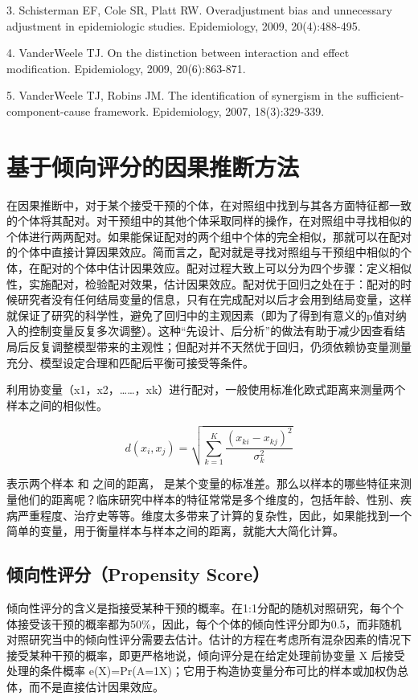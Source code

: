 \documentclass[
  chinese-hans,
  letterpaper,
  DIV=11,
  numbers=noendperiod]{scrreprt}
\begin{document}
3. Schisterman EF, Cole SR, Platt RW. Overadjustment bias and
unnecessary adjustment in epidemiologic studies. Epidemiology, 2009,
20(4):488-495.

4. VanderWeele TJ. On the distinction between interaction and effect
modification. Epidemiology, 2009, 20(6):863-871.

5. VanderWeele TJ, Robins JM. The identification of synergism in the
sufficient-component-cause framework. Epidemiology, 2007, 18(3):329-339.


\chapter{基于倾向评分的因果推断方法}\label{ux57faux4e8eux503eux5411ux8bc4ux5206ux7684ux56e0ux679cux63a8ux65adux65b9ux6cd5}

在因果推断中，对于某个接受干预的个体，在对照组中找到与其各方面特征都一致的个体将其配对。对干预组中的其他个体采取同样的操作，在对照组中寻找相似的个体进行两两配对。如果能保证配对的两个组中个体的完全相似，那就可以在配对的个体中直接计算因果效应。简而言之，配对就是寻找对照组与干预组中相似的个体，在配对的个体中估计因果效应。配对过程大致上可以分为四个步骤：定义相似性，实施配对，检验配对效果，估计因果效应。配对优于回归之处在于：配对的时候研究者没有任何结局变量的信息，只有在完成配对以后才会用到结局变量，这样就保证了研究的科学性，避免了回归中的主观因素（即为了得到有意义的p值对纳入的控制变量反复多次调整）。这种``先设计、后分析''的做法有助于减少因查看结局后反复调整模型带来的主观性；但配对并不天然优于回归，仍须依赖协变量测量充分、模型设定合理和匹配后平衡可接受等条件。

利用协变量（x1，x2，\ldots\ldots，xk）进行配对，一般使用标准化欧式距离来测量两个样本之间的相似性。

\[d(x_i,x_j)=\sqrt{\sum_{k=1}^{K}\frac{(x_{ki}-x_{kj})^2}{\sigma_k^2}}\]

表示两个样本 和 之间的距离，
是某个变量的标准差。那么以样本的哪些特征来测量他们的距离呢？临床研究中样本的特征常常是多个维度的，包括年龄、性别、疾病严重程度、治疗史等等。维度太多带来了计算的复杂性，因此，如果能找到一个简单的变量，用于衡量样本与样本之间的距离，就能大大简化计算。

\section{倾向性评分（Propensity
Score）}\label{ux503eux5411ux6027ux8bc4ux5206propensity-score}

倾向性评分的含义是指接受某种干预的概率。在1:1分配的随机对照研究，每个个体接受该干预的概率都为50\%，因此，每个个体的倾向性评分即为0.5，而非随机对照研究当中的倾向性评分需要去估计。估计的方程在考虑所有混杂因素的情况下接受某种干预的概率，即更严格地说，倾向评分是在给定处理前协变量
X 后接受处理的条件概率
e(X)=Pr(A=1\textbar X)；它用于构造协变量分布可比的样本或加权伪总体，而不是直接估计因果效应。
\end{document}
